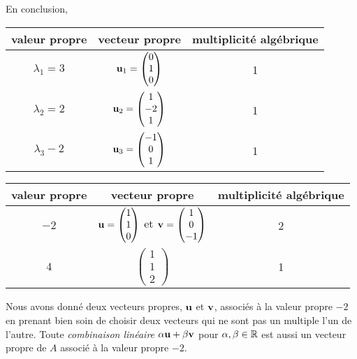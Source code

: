 {En conclusion,
\begin{center}
\begin{tabular}{c|c|c}
valeur propre & vecteur propre & multiplicité algébrique \\
\hline
\rule{0em}{2.5em} $\lambda_1 = 3$ &
$\mathbf{u}_1
=\displaystyle \begin{pmatrix} 0 \\ 1 \\ 0 \end{pmatrix}$ & 1 \\[1.5em]
$\lambda_2 = 2$ &
$\mathbf{u}_2
= \displaystyle \begin{pmatrix} 1 \\ -2 \\ 1 \end{pmatrix}$ & 1 \\[1.5em]
$\lambda_3 -2$ &
$\mathbf{u}_3
=\displaystyle \begin{pmatrix} -1 \\ 0 \\ 1 \end{pmatrix}$ & 1
\end{tabular}
\end{center}

\begin{center}
\begin{tabular}{c|c|c}
valeur propre & vecteur propre & multiplicité algébrique \\
\hline
\rule{0em}{2.5em} $-2$ &
$\displaystyle \mathbf{u} = \begin{pmatrix} 1 \\ 1 \\ 0\end{pmatrix}$ et
$\displaystyle \mathbf{v} = \begin{pmatrix} 1 \\ 0 \\ -1\end{pmatrix}$
& 2 \\[1.5em]
$4$ & $\displaystyle \begin{pmatrix} 1 \\ 1 \\ 2\end{pmatrix}$  & 1
\end{tabular}
\end{center}
Nous avons donné deux vecteurs propres, $\mathbf{u}$ et $\mathbf{v}$, associés à
la valeur propre $-2$ en prenant bien soin de choisir deux vecteurs qui
ne sont pas un multiple l'un de l'autre.  Toute
{\em combinaison linéaire} $\alpha \mathbf{u} + \beta \mathbf{v}$ pour
$\alpha, \beta \in \mathbb{R}$ est aussi un vecteur propre de $A$ associé à
la valeur propre $-2$.

}
